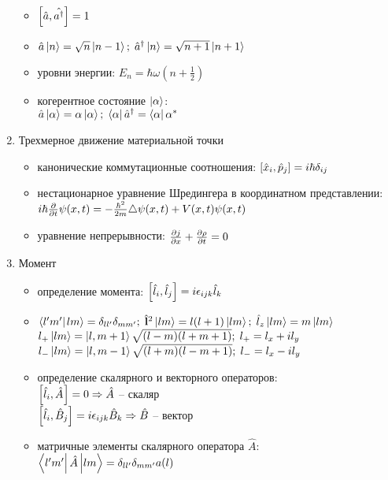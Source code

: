 \begin{enumerate}[label=\textbf{\underline{\arabic*.}}]
\begin{itemize}
            \item
            $ \left[ \hat{a}, \hat{a^\dagger} \right] = 1 $
            \item
            $ \hat{a}\left| n \right> = \sqrt{n}\left| n-1 \right>;\; \hat{a}^\dagger\left| n \right> = \sqrt{n+1}\left| n+1 \right> $
            \item уровни энергии:
            $ E_n = \hbar\omega(n+\frac12) $
            \item когерентное состояние $\left| \alpha \right>$: \\
            $ \hat{a}\left| \alpha \right> = \alpha\left| \alpha \right>;\; \left< \alpha \right|\hat{a}^\dagger = \left< \alpha \right|\alpha^* $
        \end{itemize}
\item Трехмерное движение материальной точки  \begin{itemize}
            \item канонические коммутационные соотношения:
            $ \left[ \hat{x}_{i}, \hat{p}_{j} \right] = i\hbar\delta_{ij} $
            \item нестационарное уравнение Шредингера в координатном представлении: \\
            $ i\hbar \frac{\partial }{\partial t}\psi(x,t) = -\frac{\hbar^2}{2m}\triangle\psi(x,t)+V(x,t)\psi(x,t) $
            \item уравнение непрерывности:
            $ \frac{\partial j}{\partial x} + \frac{\partial \rho}{\partial t} = 0 $
        \end{itemize}
\item Момент  \begin{itemize}
            \item определение момента:
            $ \left[ \hat{l}_{i}, \hat{l}_{j} \right] = i\epsilon_{ijk}\hat{l}_k $
            \item
            $ \braket{l'm'}{lm} = \delta_{ll'}\delta_{mm'};\; \hat{\v{l}}^2\ket{lm}=l(l+1)\ket{lm};\; \hat{l}_z\ket{lm}=m\ket{lm} $\\
            $ l_{+}\left| lm \right>=\left| l,m+1 \right>\sqrt{(l-m)(l+m+1)};\;l_{+}=l_x+il_y $\\
            $ l_{-}\left| lm \right>=\left| l,m-1 \right>\sqrt{(l+m)(l-m+1)};\;l_{-}=l_x-il_y$
            \item определение скалярного и векторного операторов: \\
            $ \left[ \hat{l}_{i}, \hat{A}_{} \right] = 0 \Rightarrow \hat{A} $ -- скаляр \\
            $ \left[ \hat{l}_{i}, \hat{B}_{j} \right] = i\epsilon_{ijk}\hat{B}_k \Rightarrow \hat{B} $ -- вектор
            \item матричные элементы скалярного оператора $\hat{A}$:
            $ \matrixel{l'm'}{\hat{A}}{lm} = \delta_{ll'}\delta_{mm'}a(l) $

\end{itemize}
\end{enumerate}

